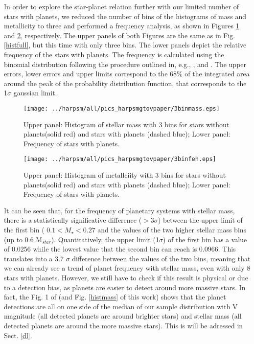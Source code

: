 \documentclass[structabstract]{aa}
\begin{document}

In order to explore the star-planet relation further with our limited number of stars with planets, we reduced the number of bins of the histograms of mass and metallicity to three and performed a frequency analysis, as shown in Figures \ref{3binmass} and \ref{3binfeh}, respectively. The upper panels of both Figures are the same as in Fig. \ref{histfull}, but this time with only three bins. The lower panels depict the relative frequency of the stars with planets. The frequency is calculated using the binomial distribution following the procedure outlined in, e.g., \citet[][]{Burgasser-2003,McCarthy-2004, Endl-2006}, and \citet{Sozzetti-2009}. The upper errors, lower errors and upper limits correspond to the 68\% of the integrated area around the peak of the probability distribution function, that corresponds to the 1$\sigma$ gaussian limit. 

\begin{figure}[h]
\begin{center}
\texttt{[image: ../harpsm/all/pics\_harpsmgtovpaper/3binmass.eps]}
\end{center}
\caption{Upper panel: Histogram of stellar mass with 3 bins for stars without planets(solid red) and stars with planets (dashed blue); Lower panel: Frequency of stars with planets.}
\label{3binmass}
\end{figure}

\begin{figure}[h]
\begin{center}
\texttt{[image: ../harpsm/all/pics\_harpsmgtovpaper/3binfeh.eps]}
\end{center}
\caption{Upper panel: Histogram of metallciity with 3 bins for stars without planets(solid red) and stars with planets (dashed blue); Lower panel: Frequency of stars with planets.}
\label{3binfeh}
\end{figure}

It can be seen that, for the frequency of planetary systems with stellar mass, there is a statistically significative difference ($> 3\sigma$)  between the upper limit of the first bin ( $0.1 < M_{\star} < 0.27$ and the values of the two higher stellar mass bins (up to 0.6 M$_{star}$). Quantitatively, the upper limit (1$\sigma$) of the first bin has a value of 0.0256 while the lowest value that the second bin can reach is 0.0966. This translates into a 3.7 $\sigma$ difference between the values of the two bins, meaning that we can already see a trend of planet frequency with stellar mass, even with only 8 stars with planets. However, we still have to check if this result is physical or due to a detection bias, as planets are easier to detect around more massive stars. In fact, the Fig. 1 of \citet{Bonfils-2011} (and Fig. \ref{histmass} of this work) shows that the planet detections are all on one side of the median of our sample distribution with V magnitude (all detected planets are around brighter stars) and stellar mass (all detected planets are around the more massive stars). This is will be adressed in Sect. \ref{dl}.
\end{document}
